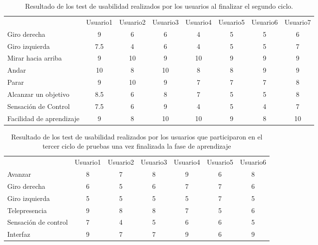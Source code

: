 \documentclass[twoside, 11pt]{epstfg}
\begin{document}
\begin{center}
	\begin{table}[h]
		\small
		
		\begin{tabular}{|g  c  c  c  c  c  c  c |}
			\hline
			 \\ \hline
			& Usuario1 & Usuario2 & Usuario3 & Usuario4 & Usuario5 & Usuario6 & Usuario7\\
			
			Giro derecha & 9 & 6 & 6 & 4 & 5 & 5 & 6\\
			Giro izquierda & 7.5 & 4 & 6 & 4 & 5 & 5 & 7\\
			Mirar hacia arriba & 9 & 10 & 9 & 10 & 9 & 9 & 9\\
			Andar & 10 & 8 & 10 & 8 & 8 & 9 & 9\\
			Parar & 9 & 10 & 9 & 7 & 7 & 7 & 8\\
			Alcanzar un objetivo & 8.5 & 6 & 8 & 7 & 5 & 5 & 8\\
			Sensación de Control & 7.5 & 6 & 9 & 4 & 5 & 4 & 7\\
			Facilidad de aprendizaje & 9 & 8 & 10 & 10 & 9 & 8 & 10\\
			\hline
		\end{tabular}
		\caption{Resultado de los test de usabilidad realizados por los usuarios al finalizar el segundo ciclo.}
		\label{tabla2ciclo}
	\end{table}
\end{center}


\begin{center}
	
	\begin{table}[h!]
		\small	
		
		\begin{tabular}{|g c c c c c c|}
			\hline
			 \\ \hline
			& Usuario1	&Usuario2	&Usuario3	&Usuario4	&Usuario5	&Usuario6 \\
			Avanzar
			& 8 &7 &8 &9 &6 & 8\\
			Giro derecha
			& 6 & 5 &6 &7 & 7& 6\\
			Giro izquierda
			& 5 & 5&5 &5 &7 & 5\\
			Telepresencia
			& 9 & 8 &8 & 7& 5& 6\\ 
			Sensación de control
			& 7 &4 &5 & 6&6 & 5\\
			Interfaz
			& 9 &7 & 7& 9& 6& 9\\
			\hline
		\end{tabular}
		\caption{Resultado de los test de usabilidad realizados por los usuarios que participaron en el tercer ciclo de pruebas una vez finalizada la fase de aprendizaje}
		\label{tabla3ciclo}
	\end{table}
\end{center}
\end{document}
